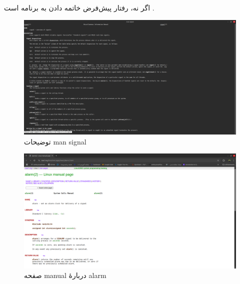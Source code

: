 \documentclass[12pt]{article}
\begin{document}
		اگر نه، رفتار پیش‌فرض خاتمه دادن به برنامه است \cite{a3}.
	\begin{figure}[H]
		\centering
		\includegraphics[width=\textwidth]{report5-resources/8.png}
		\caption{توضیحات \textenglish{man signal}}
		\label{img:8}
	\end{figure}
	\begin{figure}[H]
		\centering
		\includegraphics[width=\textwidth]{report5-resources/9.png}
		\caption{صفحه \textenglish{manual} دربارهٔ \textenglish{alarm}}
		\label{img:9}
	\end{figure}
	
\end{document}
